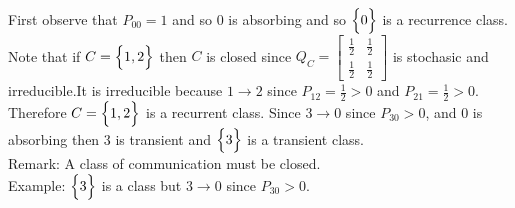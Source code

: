 \documentclass[12pt]{article}
\begin{document}
First observe that $P_{00} = 1$ and so $0$ is absorbing and so $\Big\{ 0 \Big\}$ is a recurrence class. Note that if $C = \Big\{ 1,2 \Big\}$ then $C$ is closed since $Q_C = \begin{bmatrix} \frac{1}{2} & \frac{1}{2} \\ \frac{1}{2} & \frac{1}{2} \end{bmatrix}$ is stochasic and irreducible.It is irreducible because $1 \to 2$ since $P_{12} = \frac{1}{2} > 0$ and $P_{21} = \frac{1}{2} > 0$. Therefore $C = \Big\{ 1,2 \Big\}$ is a recurrent class. Since $3 \to 0$ since $P_{30} > 0$, and $0$ is absorbing then $3$ is transient and $\Big\{ 3 \Big\}$ is a transient class. \\
Remark: A class of communication must be closed. \\
Example: $\Big\{ 3 \Big\}$ is a class but $3 \to 0$ since $P_{30} > 0$. 
\end{document}
